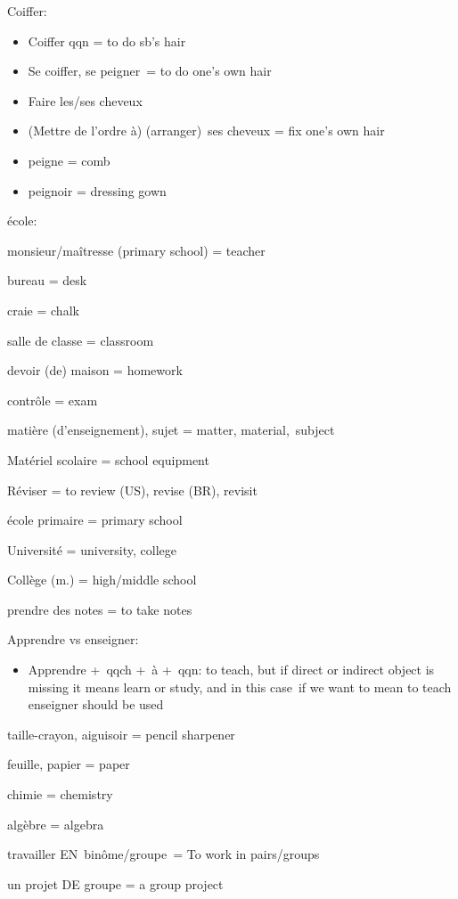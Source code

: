 Coiffer:

\begin{itemize}
\item
  Coiffer qqn = to do sb's hair
\item
  Se coiffer, se peigner~= to do one's own hair~
\item
  {Faire les/ses cheveux}~
\item
  (Mettre de l'ordre à) (arranger)~ses cheveux = fix one's own hair
\item
  peigne = comb
\item
  peignoir = dressing gown
\end{itemize}

école:

monsieur/maîtresse (primary school) = teacher

bureau = desk

craie = chalk

salle de classe = classroom

devoir (de) maison = homework

contrôle = exam

{matière (d'enseignement), sujet = matter, material,~subject}

{Matériel scolaire = school equipment~}

{Réviser = to review (US), revise (BR), revisit}

{école primaire = primary school}

{Université = university, college~}

{Collège (m.) = high/middle school}

{prendre des notes = to take notes}

{Apprendre vs enseigner:}

\begin{itemize}
\item
  {Apprendre +~qqch +~à +~qqn: to teach, but if direct or indirect
  object is missing it means learn or study, and in this case~if we want
  to mean to teach enseigner should be used}
\end{itemize}

{taille-crayon, aiguisoir = pencil sharpener}

{feuille, papier = paper}

{chimie = chemistry}

{algèbre = algebra}

{travailler} {EN}{~}{binôme}{/groupe}{~}{= To work in pairs/groups}

{un projet} {DE} {groupe = a group project}

